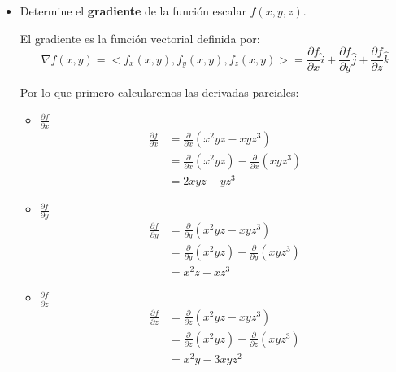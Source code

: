 \documentclass[12pt]{article}
\begin{document}
\begin{itemize}[format=\textbf]
  
\item Determine el \textbf{gradiente} de la función escalar $f(x, y, z)$.

  El gradiente es la función vectorial definida por:
  \[
  \nabla f(x,y) = <f_x(x,y), f_y(x,y), f_z(x,y)> = \frac{\partial f}{\partial x}\hat{i} + \frac{\partial f}{\partial y}\hat{j} + \frac{\partial f}{\partial z}\hat{k}
  \]
  
  Por lo que primero calcularemos las derivadas parciales:

  \begin{itemize}
    
  \item $\frac{\partial f}{\partial x}$ \\
    
    \begin{align*}
      \frac{\partial f}{\partial x} &= \frac{\partial}{\partial x}
      \left(  x^2yz - xyz^3
      \right) \\
      &= \frac{\partial}{\partial x}( x^2yz) - \frac{\partial}{\partial x} ( xyz^3) \\
      &= 2xyz - yz^3
    \end{align*}
    
  \item $\frac{\partial f}{\partial y}$ \\
    
    \begin{align*}
      \frac{\partial f}{\partial y} &= \frac{\partial }{\partial y}
      \left(  x^2yz - xyz^3
      \right)\\
      &= \frac{\partial }{\partial y}(x^2yz)-\frac{\partial }{\partial y}(xyz^3)\\
      &= x^2z - xz^3
    \end{align*}
    
  \item $\frac{\partial f}{\partial z}$ \\
    
    \begin{align*}
      \frac{\partial f}{\partial z} &= \frac{\partial }{\partial z}
      \left(  x^2yz - xyz^3
      \right)\\
      &=\frac{\partial }{\partial z}(x^2yz) - \frac{\partial }{\partial z}(xyz^3) \\
      &= x^2y - 3xyz^2
    \end{align*}
    

\end{itemize}
\end{itemize}
\end{document}

